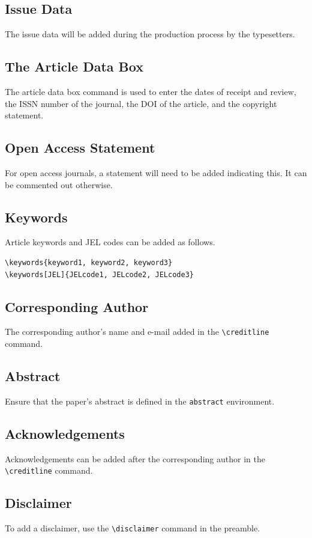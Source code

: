 \documentclass[example,biber]{now-journal} %
\begin{document}
\subsection{Issue Data}
The issue data will be added during the production process by the typesetters.

\subsection{The Article Data Box}
The article data box command is used to enter the dates of receipt and review, the ISSN number of the journal, the DOI of the article, and the copyright statement.

\subsection{Open Access Statement}
For open access journals, a statement will need to be added indicating this. It can be commented out otherwise.

\subsection{Keywords}
Article keywords and JEL codes can be added as follows.
\begin{verbatim}
\keywords{keyword1, keyword2, keyword3}
\keywords[JEL]{JELcode1, JELcode2, JELcode3}
\end{verbatim}

\subsection{Corresponding Author}
The corresponding author's name and e-mail added in the \texttt{\textbackslash creditline} command.

\subsection{Abstract}
Ensure that the paper’s abstract is defined in the \texttt{abstract} environment.

\subsection{Acknowledgements}
Acknowledgements can be added after the corresponding author in the \texttt{\textbackslash creditline} command.

\subsection{Disclaimer}
To add a disclaimer, use the \texttt{\textbackslash disclaimer} command in the preamble.
\end{document}
